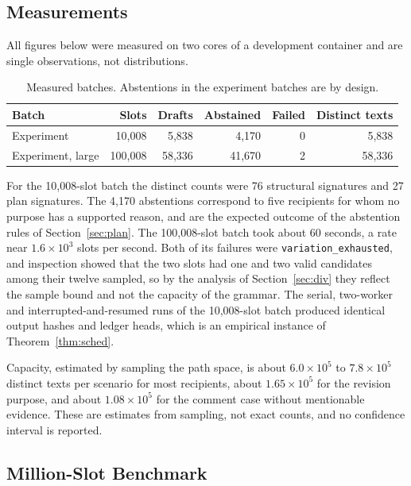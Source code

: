 \documentclass[11pt]{article}
\theoremstyle{definition}
\theoremstyle{remark}
\newcommand{\code}[1]{\texttt{#1}}
\begin{document}
\subsection{Measurements}

All figures below were measured on two cores of a development container and are single observations, not distributions.

\begin{table}[H]
\centering
\caption{Measured batches. Abstentions in the experiment batches are by design.}\label{tab:runs}
\begin{tabular}{lrrrrr}
\toprule
Batch & Slots & Drafts & Abstained & Failed & Distinct texts\\
\midrule
Experiment & 10,008 & 5,838 & 4,170 & 0 & 5,838\\
Experiment, large & 100,008 & 58,336 & 41,670 & 2 & 58,336\\
\bottomrule
\end{tabular}
\end{table}

For the 10,008-slot batch the distinct counts were 76 structural signatures and 27 plan signatures. The 4,170 abstentions correspond to five recipients for whom no purpose has a supported reason, and are the expected outcome of the abstention rules of Section~\ref{sec:plan}. The 100,008-slot batch took about 60 seconds, a rate near $1.6\times10^{3}$ slots per second. Both of its failures were \code{variation\_exhausted}, and inspection showed that the two slots had one and two valid candidates among their twelve sampled, so by the analysis of Section~\ref{sec:div} they reflect the sample bound and not the capacity of the grammar. The serial, two-worker and interrupted-and-resumed runs of the 10,008-slot batch produced identical output hashes and ledger heads, which is an empirical instance of Theorem~\ref{thm:sched}.

Capacity, estimated by sampling the path space, is about $6.0\times10^{5}$ to $7.8\times10^{5}$ distinct texts per scenario for most recipients, about $1.65\times10^{5}$ for the revision purpose, and about $1.08\times10^{5}$ for the comment case without mentionable evidence. These are estimates from sampling, not exact counts, and no confidence interval is reported.

\subsection{Million-Slot Benchmark}
\end{document}

